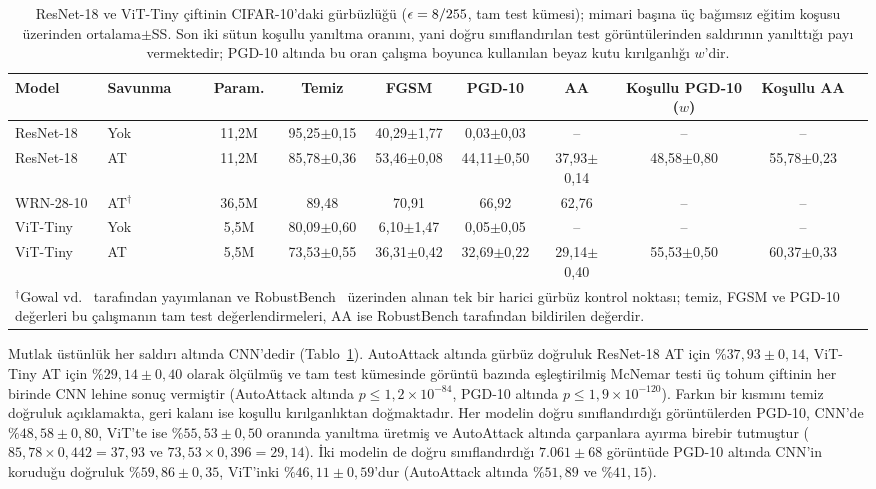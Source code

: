 \begin{table}[!t]
\centering
\caption{ResNet-18 ve ViT-Tiny çiftinin CIFAR-10'daki gürbüzlüğü ($\epsilon = 8/255$, tam test kümesi); mimari başına üç bağımsız eğitim koşusu üzerinden ortalama$\pm$SS. Son iki sütun koşullu yanıltma oranını, yani doğru sınıflandırılan test görüntülerinden saldırının yanılttığı payı vermektedir; PGD-10 altında bu oran çalışma boyunca kullanılan beyaz kutu kırılganlığı $w$'dir.}
\label{tab:main_results}
\scriptsize
\setlength{\tabcolsep}{3pt}
\begin{tabular}{llcccccccc}
\toprule
\textbf{Model} & \textbf{Savunma} & \textbf{Param.} & \textbf{Temiz} & \textbf{FGSM} & \textbf{PGD-10} & \textbf{AA} & \textbf{Koşullu PGD-10 ($w$)} & \textbf{Koşullu AA} \\
\midrule
ResNet-18 & Yok & 11,2M & 95,25$\pm$0,15 & 40,29$\pm$1,77 & 0,03$\pm$0,03 & -- & -- & -- \\
ResNet-18 & AT & 11,2M & 85,78$\pm$0,36 & 53,46$\pm$0,08 & 44,11$\pm$0,50 & 37,93$\pm$0,14 & 48,58$\pm$0,80 & 55,78$\pm$0,23 \\
WRN-28-10 & AT$^\dagger$ & 36,5M & 89,48 & 70,91 & 66,92 & 62,76 & -- & -- \\
ViT-Tiny & Yok & 5,5M & 80,09$\pm$0,60 & 6,10$\pm$1,47 & 0,05$\pm$0,05 & -- & -- & -- \\
ViT-Tiny & AT & 5,5M & 73,53$\pm$0,55 & 36,31$\pm$0,42 & 32,69$\pm$0,22 & 29,14$\pm$0,40 & 55,53$\pm$0,50 & 60,37$\pm$0,33 \\
\bottomrule
\multicolumn{9}{p{0.96\textwidth}}{\scriptsize $^\dagger$Gowal vd.~\cite{gowal2020uncovering} tarafından yayımlanan ve RobustBench~\cite{croce2021robustbench} üzerinden alınan tek bir harici gürbüz kontrol noktası; temiz, FGSM ve PGD-10 değerleri bu çalışmanın tam test değerlendirmeleri, AA ise RobustBench tarafından bildirilen değerdir.}
\end{tabular}
\end{table}

Mutlak üstünlük her saldırı altında CNN'dedir (Tablo~\ref{tab:main_results}). AutoAttack altında gürbüz doğruluk ResNet-18 AT için $\%37{,}93\pm0{,}14$, ViT-Tiny AT için $\%29{,}14\pm0{,}40$ olarak ölçülmüş ve tam test kümesinde görüntü bazında eşleştirilmiş McNemar testi üç tohum çiftinin her birinde CNN lehine sonuç vermiştir (AutoAttack altında $p \leq 1{,}2\times10^{-84}$, PGD-10 altında $p \leq 1{,}9\times10^{-120}$). Farkın bir kısmını temiz doğruluk açıklamakta, geri kalanı ise koşullu kırılganlıktan doğmaktadır. Her modelin doğru sınıflandırdığı görüntülerden PGD-10, CNN'de $\%48{,}58\pm0{,}80$, ViT'te ise $\%55{,}53\pm0{,}50$ oranında yanıltma üretmiş ve AutoAttack altında çarpanlara ayırma birebir tutmuştur ($85{,}78\times0{,}442 = 37{,}93$ ve $73{,}53\times0{,}396 = 29{,}14$). İki modelin de doğru sınıflandırdığı $7.061\pm68$ görüntüde PGD-10 altında CNN'in koruduğu doğruluk $\%59{,}86\pm0{,}35$, ViT'inki $\%46{,}11\pm0{,}59$'dur (AutoAttack altında $\%51{,}89$ ve $\%41{,}15$).

